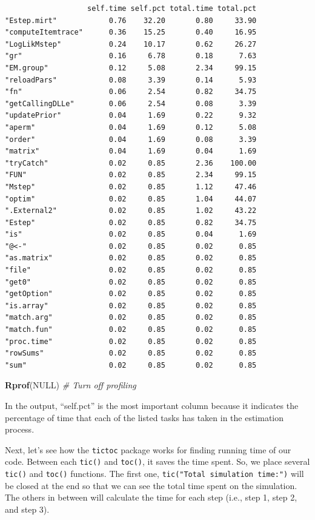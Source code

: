 \documentclass[
]{book}
\newenvironment{Shaded}{\begin{snugshade}}{\end{snugshade}}
\newcommand{\CommentTok}[1]{\textcolor[rgb]{0.56,0.35,0.01}{\textit{#1}}}
\newcommand{\KeywordTok}[1]{\textcolor[rgb]{0.13,0.29,0.53}{\textbf{#1}}}
\newcommand{\NormalTok}[1]{#1}
\newcommand{\OtherTok}[1]{\textcolor[rgb]{0.56,0.35,0.01}{#1}}
\begin{document}
\begin{verbatim}
                   self.time self.pct total.time total.pct
"Estep.mirt"            0.76    32.20       0.80     33.90
"computeItemtrace"      0.36    15.25       0.40     16.95
"LogLikMstep"           0.24    10.17       0.62     26.27
"gr"                    0.16     6.78       0.18      7.63
"EM.group"              0.12     5.08       2.34     99.15
"reloadPars"            0.08     3.39       0.14      5.93
"fn"                    0.06     2.54       0.82     34.75
"getCallingDLLe"        0.06     2.54       0.08      3.39
"updatePrior"           0.04     1.69       0.22      9.32
"aperm"                 0.04     1.69       0.12      5.08
"order"                 0.04     1.69       0.08      3.39
"matrix"                0.04     1.69       0.04      1.69
"tryCatch"              0.02     0.85       2.36    100.00
"FUN"                   0.02     0.85       2.34     99.15
"Mstep"                 0.02     0.85       1.12     47.46
"optim"                 0.02     0.85       1.04     44.07
".External2"            0.02     0.85       1.02     43.22
"Estep"                 0.02     0.85       0.82     34.75
"is"                    0.02     0.85       0.04      1.69
"@<-"                   0.02     0.85       0.02      0.85
"as.matrix"             0.02     0.85       0.02      0.85
"file"                  0.02     0.85       0.02      0.85
"get0"                  0.02     0.85       0.02      0.85
"getOption"             0.02     0.85       0.02      0.85
"is.array"              0.02     0.85       0.02      0.85
"match.arg"             0.02     0.85       0.02      0.85
"match.fun"             0.02     0.85       0.02      0.85
"proc.time"             0.02     0.85       0.02      0.85
"rowSums"               0.02     0.85       0.02      0.85
"sum"                   0.02     0.85       0.02      0.85
\end{verbatim}

\begin{Shaded}
\begin{Highlighting}[]
\KeywordTok{Rprof}\NormalTok{(}\OtherTok{NULL}\NormalTok{) }\CommentTok{# Turn off profiling}
\end{Highlighting}
\end{Shaded}

In the output, ``self.pct'' is the most important column because it indicates the percentage of time that each of the listed tasks has taken in the estimation process.

Next, let's see how the \texttt{tictoc} package works for finding running time of our code. Between each \texttt{tic()} and \texttt{toc()}, it saves the time spent. So, we place several \texttt{tic()} and \texttt{toc()} functions. The first one, \texttt{tic("Total\ simulation\ time:")} will be closed at the end so that we can see the total time spent on the simulation. The others in between will calculate the time for each step (i.e., step 1, step 2, and step 3).
\end{document}
